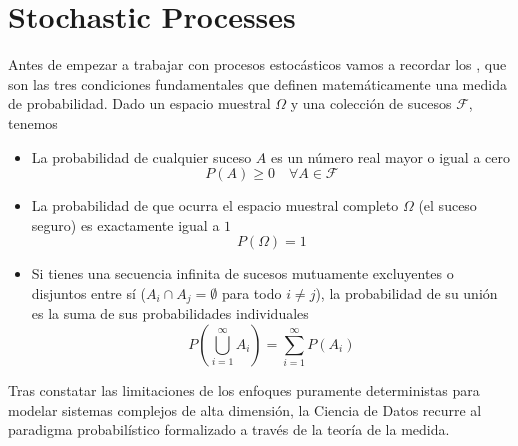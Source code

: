 \chapter{Stochastic Processes}
\noindent
Antes de empezar a trabajar con procesos estocásticos vamos a recordar los , que son las tres condiciones fundamentales que definen matemáticamente una medida de probabilidad. Dado un espacio muestral $\Omega$ y una colección de sucesos $\mathcal{F}$, tenemos

\begin{itemize}
    \item {} La probabilidad de cualquier suceso $A$ es un número real mayor o igual a cero
    \begin{equation*}
        P(A) \geq 0 \quad \forall A \in \mathcal{F}
    \end{equation*}
    \item {} La probabilidad de que ocurra el espacio muestral completo $\Omega$ (el suceso seguro) es exactamente igual a $1$
    \begin{equation*}
        P(\Omega) = 1
    \end{equation*}
    \item {} Si tienes una secuencia infinita de sucesos mutuamente excluyentes o disjuntos entre sí ($A_i \cap A_j = \emptyset$ para todo $i \neq j$), la probabilidad de su unión es la suma de sus probabilidades individuales
    \begin{equation*}
        P\left(\bigcup_{i=1}^{\infty} A_i\right) = \sum_{i=1}^{\infty} P(A_i)
    \end{equation*}
\end{itemize}

\noindent
Tras constatar las limitaciones de los enfoques puramente deterministas para modelar sistemas complejos de alta dimensión, la Ciencia de Datos recurre al paradigma probabilístico formalizado a través de la teoría de la medida. 

